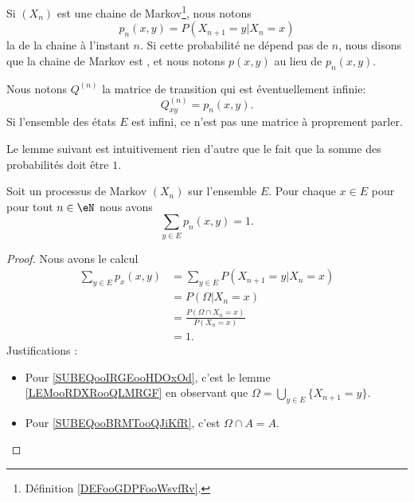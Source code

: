 \begin{definition}      \label{DEFooVVWUooKIBQDv}
	Si \( (X_n)\) est une chaine de Markov\footnote{Définition \ref{DEFooGDPFooWsvfRv}.}, nous notons
	\begin{equation}
		p_n(x,y)=P(X_{n+1}=y|X_n=x)
	\end{equation}
	la  de la chaine à l'instant \( n\). Si cette probabilité ne dépend pas de \( n\), nous disons que la chaine de Markov est , et nous notons \( p(x,y)\) au lieu de \( p_n(x,y)\).
\end{definition}

\begin{definition}       \label{DEFooKQROooYvJvvl}
	Nous notons \( Q^{(n)}\) la matrice de transition qui est éventuellement infinie:
	\begin{equation}
		Q^{(n)}_{xy}=p_n(x,y).
	\end{equation}
	Si l'ensemble des états \( E\) est infini, ce n'est pas une matrice à proprement parler.
\end{definition}

Le lemme suivant est intuitivement rien d'autre que le fait que la somme des probabilités doit être \( 1\).
\begin{lemma}       \label{LEMooQNIWooQBMlge}
	Soit un processus de Markov \( (X_n)\) sur l'ensemble \( E\). Pour chaque \( x\in E\) pour pour tout \( n\in \eN\) nous avons
	\begin{equation}
		\sum_{y\in E}p_n(x,y)=1.
	\end{equation}
\end{lemma}

\begin{proof}
	Nous avons le calcul
	\begin{subequations}
		\begin{align}
			\sum_{y\in E}p_x(x,y) & =\sum_{y\in E}P(X_{n+1}=y|X_n=x)                      \\
			                      & =  P(\Omega|X_n=x)        \label{SUBEQooIRGEooHDOxOd} \\
			                      & =\frac{ P(\Omega\cap X_n=x) }{ P(X_n=x) }             \\
			                      & =1\label{SUBEQooBRMTooQJiKfR}.
		\end{align}
	\end{subequations}
	Justifications :
	\begin{itemize}
		\item Pour \eqref{SUBEQooIRGEooHDOxOd}, c'est le lemme \ref{LEMooRDXRooQLMRGF} en observant que \( \Omega=\bigcup_{y\in E}\{ X_{n+1}=y \}\).
		\item Pour \eqref{SUBEQooBRMTooQJiKfR}, c'est \( \Omega\cap A=A\).
	\end{itemize}
\end{proof}

